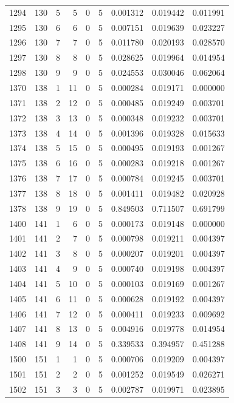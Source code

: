\begin{longtable}{rrrrrrrrr}
1294 & 130 & 5 & 5 & 0 & 5 & 0.001312 & 0.019442 & 0.011991 \\
1295 & 130 & 6 & 6 & 0 & 5 & 0.007151 & 0.019639 & 0.023227 \\
1296 & 130 & 7 & 7 & 0 & 5 & 0.011780 & 0.020193 & 0.028570 \\
1297 & 130 & 8 & 8 & 0 & 5 & 0.028625 & 0.019964 & 0.014954 \\
1298 & 130 & 9 & 9 & 0 & 5 & 0.024553 & 0.030046 & 0.062064 \\
1370 & 138 & 1 & 11 & 0 & 5 & 0.000284 & 0.019171 & 0.000000 \\
1371 & 138 & 2 & 12 & 0 & 5 & 0.000485 & 0.019249 & 0.003701 \\
1372 & 138 & 3 & 13 & 0 & 5 & 0.000348 & 0.019232 & 0.003701 \\
1373 & 138 & 4 & 14 & 0 & 5 & 0.001396 & 0.019328 & 0.015633 \\
1374 & 138 & 5 & 15 & 0 & 5 & 0.000495 & 0.019193 & 0.001267 \\
1375 & 138 & 6 & 16 & 0 & 5 & 0.000283 & 0.019218 & 0.001267 \\
1376 & 138 & 7 & 17 & 0 & 5 & 0.000784 & 0.019245 & 0.003701 \\
1377 & 138 & 8 & 18 & 0 & 5 & 0.001411 & 0.019482 & 0.020928 \\
1378 & 138 & 9 & 19 & 0 & 5 & 0.849503 & 0.711507 & 0.691799 \\
1400 & 141 & 1 & 6 & 0 & 5 & 0.000173 & 0.019148 & 0.000000 \\
1401 & 141 & 2 & 7 & 0 & 5 & 0.000798 & 0.019211 & 0.004397 \\
1402 & 141 & 3 & 8 & 0 & 5 & 0.000207 & 0.019201 & 0.004397 \\
1403 & 141 & 4 & 9 & 0 & 5 & 0.000740 & 0.019198 & 0.004397 \\
1404 & 141 & 5 & 10 & 0 & 5 & 0.000103 & 0.019169 & 0.001267 \\
1405 & 141 & 6 & 11 & 0 & 5 & 0.000628 & 0.019192 & 0.004397 \\
1406 & 141 & 7 & 12 & 0 & 5 & 0.000411 & 0.019233 & 0.009692 \\
1407 & 141 & 8 & 13 & 0 & 5 & 0.004916 & 0.019778 & 0.014954 \\
1408 & 141 & 9 & 14 & 0 & 5 & 0.339533 & 0.394957 & 0.451288 \\
1500 & 151 & 1 & 1 & 0 & 5 & 0.000706 & 0.019209 & 0.004397 \\
1501 & 151 & 2 & 2 & 0 & 5 & 0.001252 & 0.019549 & 0.026271 \\
1502 & 151 & 3 & 3 & 0 & 5 & 0.002787 & 0.019971 & 0.023895 \\

\end{longtable}
